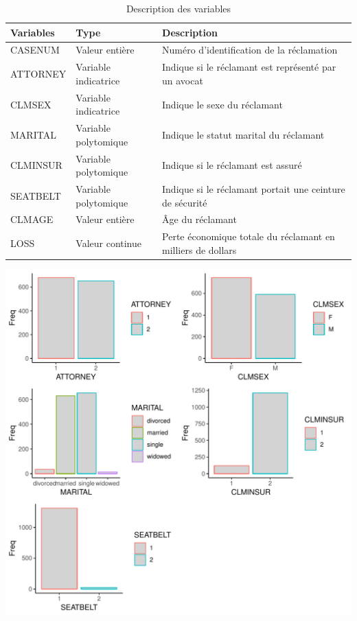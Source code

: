 \documentclass{article}\usepackage[]{graphicx}\usepackage[]{color}
\makeatletter
\def\maxwidth{ %
  \ifdim\Gin@nat@width>\linewidth
    \linewidth
  \else
    \Gin@nat@width
  \fi
}
\newenvironment{knitrout}{}{} %
\makeatother
\begin{document}
\begin{table}[htb]
\caption{Description des variables}
\begin{tabular}{lll}
\hline
\textbf{Variables} & \textbf{Type}        & \textbf{Description}                                         \\ \hline
CASENUM            & Valeur entière       & Numéro d'identification de la réclamation                    \\ \hline
ATTORNEY           & Variable indicatrice & Indique si le réclamant est représenté par un avocat         \\ \hline
CLMSEX             & Variable indicatrice & Indique le sexe du réclamant                                 \\ \hline
MARITAL            & Variable polytomique & Indique le statut marital du réclamant                       \\ \hline
CLMINSUR           & Variable polytomique & Indique si le réclamant est assuré                           \\ \hline
SEATBELT           & Variable polytomique & Indique si le réclamant portait une ceinture de sécurité     \\ \hline
CLMAGE             & Valeur entière       & Âge du réclamant                                             \\ \hline
LOSS               & Valeur continue      & Perte économique totale du réclamant  en milliers de dollars \\ \hline
\end{tabular}
\end{table}

\newpage
\begin{knitrout}
\color{fgcolor}
\includegraphics[width=\maxwidth]{figure/unnamed-chunk-2-1} 

\end{knitrout}
\end{document}
